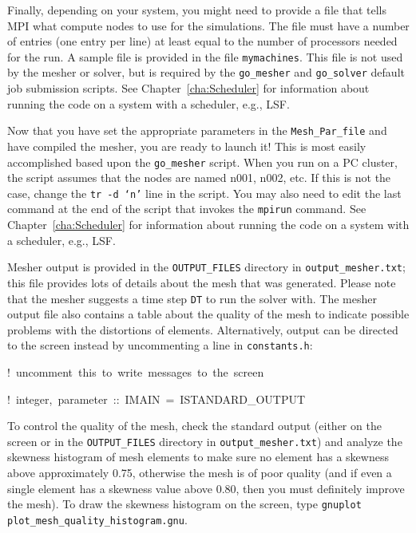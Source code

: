 Finally, depending on your system, you might need to provide a file
that tells MPI what compute nodes to use for the simulations. The
file must have a number of entries (one entry per line) at least equal
to the number of processors needed for the run. A sample file is provided
in the file \texttt{mymachines}. This file is not used by the mesher
or solver, but is required by the \texttt{go\_mesher} and \texttt{go\_solver}
default job submission scripts. See Chapter~\ref{cha:Scheduler}
for information about running the code on a system with a scheduler,
e.g., LSF.

Now that you have set the appropriate parameters in the \texttt{Mesh\_Par\_file}
and have compiled the mesher, you are ready to launch it! This is
most easily accomplished based upon the \texttt{go\_mesher} script.
When you run on a PC cluster, the script assumes that the nodes are
named n001, n002, etc. If this is not the case, change the \texttt{tr
-d `n'} line in the script. You may also need to edit the last command
at the end of the script that invokes the \texttt{mpirun} command.
See Chapter~\ref{cha:Scheduler} for information about running the
code on a system with a scheduler, e.g., LSF.

Mesher output is provided in the \texttt{OUTPUT\_FILES} directory
in \texttt{output\_mesher.txt}; this file provides lots of details
about the mesh that was generated. Please note that the mesher suggests
a time step \texttt{DT} to run the solver with. The mesher output
file also contains a table about the quality of the mesh to indicate
possible problems with the distortions of elements. Alternatively,
output can be directed to the screen instead by uncommenting a line
in \texttt{constants.h}:
\begin{lyxcode}
!~uncomment~this~to~write~messages~to~the~screen~

!~integer,~parameter~::~IMAIN~=~ISTANDARD\_OUTPUT
\end{lyxcode}
To control the quality of the mesh, check the standard output (either
on the screen or in the \texttt{OUTPUT\_FILES} directory in \texttt{output\_mesher.txt})
and analyze the skewness histogram of mesh elements to make sure no
element has a skewness above approximately 0.75, otherwise the mesh
is of poor quality (and if even a single element has a skewness value
above 0.80, then you must definitely improve the mesh). To draw the
skewness histogram on the screen, type \texttt{gnuplot plot\_mesh\_quality\_histogram.gnu}.

